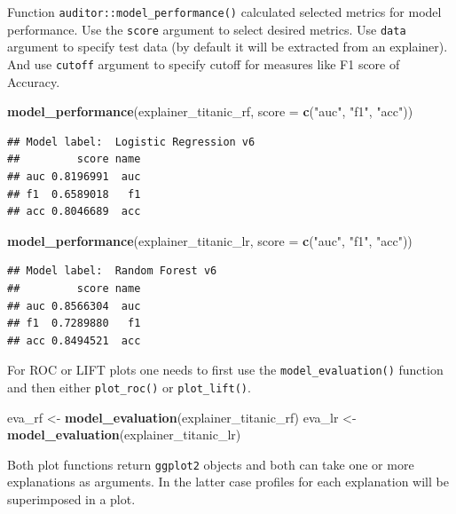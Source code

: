 \documentclass[12pt,]{krantz}
\newenvironment{Shaded}{\begin{snugshade}}{\end{snugshade}}
\newcommand{\DataTypeTok}[1]{\textcolor[rgb]{0.13,0.29,0.53}{#1}}
\newcommand{\KeywordTok}[1]{\textcolor[rgb]{0.13,0.29,0.53}{\textbf{#1}}}
\newcommand{\NormalTok}[1]{#1}
\newcommand{\StringTok}[1]{\textcolor[rgb]{0.31,0.60,0.02}{#1}}
\begin{document}
Function \texttt{auditor::model\_performance()} calculated selected metrics for model performance. Use the \texttt{score} argument to select desired metrics. Use \texttt{data} argument to specify test data (by default it will be extracted from an explainer). And use \texttt{cutoff} argument to specify cutoff for measures like F1 score of Accuracy.

\begin{Shaded}
\begin{Highlighting}[]
\KeywordTok{model_performance}\NormalTok{(explainer_titanic_rf, }\DataTypeTok{score =} \KeywordTok{c}\NormalTok{(}\StringTok{"auc"}\NormalTok{, }\StringTok{"f1"}\NormalTok{, }\StringTok{"acc"}\NormalTok{))}
\end{Highlighting}
\end{Shaded}

\begin{verbatim}
## Model label:  Logistic Regression v6 
##         score name
## auc 0.8196991  auc
## f1  0.6589018   f1
## acc 0.8046689  acc
\end{verbatim}

\begin{Shaded}
\begin{Highlighting}[]
\KeywordTok{model_performance}\NormalTok{(explainer_titanic_lr, }\DataTypeTok{score =} \KeywordTok{c}\NormalTok{(}\StringTok{"auc"}\NormalTok{, }\StringTok{"f1"}\NormalTok{, }\StringTok{"acc"}\NormalTok{))}
\end{Highlighting}
\end{Shaded}

\begin{verbatim}
## Model label:  Random Forest v6 
##         score name
## auc 0.8566304  auc
## f1  0.7289880   f1
## acc 0.8494521  acc
\end{verbatim}

For ROC or LIFT plots one needs to first use the \texttt{model\_evaluation()} function and then either \texttt{plot\_roc()} or \texttt{plot\_lift()}.

\begin{Shaded}
\begin{Highlighting}[]
\NormalTok{eva_rf <-}\StringTok{ }\KeywordTok{model_evaluation}\NormalTok{(explainer_titanic_rf)}
\NormalTok{eva_lr <-}\StringTok{ }\KeywordTok{model_evaluation}\NormalTok{(explainer_titanic_lr)}
\end{Highlighting}
\end{Shaded}

Both plot functions return \texttt{ggplot2} objects and both can take one or more explanations as arguments. In the latter case profiles for each explanation will be superimposed in a plot.
\end{document}
